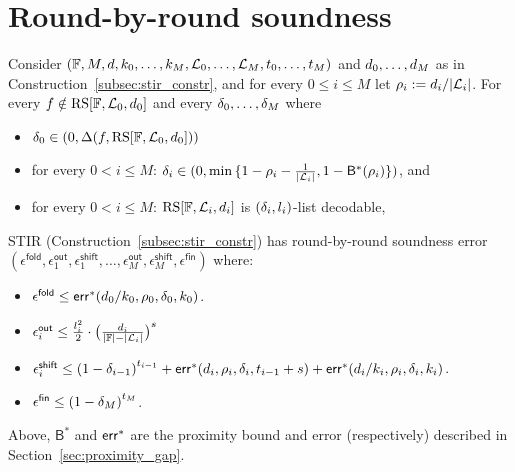 \section{Round-by-round soundness}\label{sec:rnd_by_rnd_soundness}
\begin{lemma}\label{lemma:rnd_by_rnd_soundness}
    Consider $(\mathbb{F},M,d,k_0,\ldots,k_M,\mathcal{L}_0,\ldots,\mathcal{L}_M,t_0,\ldots,t_M)$ and $d_0,\ldots,d_M$ as in Construction~\ref{subsec:stir_constr}, and for every $0\leq i\leq M$ let $\rho_i:=d_i/|\mathcal{L}_i|$. For every $f\notin\mathrm{RS}[\mathbb{F},\mathcal{L}_0,d_0]$ and every $\delta_0,\ldots,\delta_M$ where
    \begin{itemize}
        \item $\delta_0\in(0,\Delta(f,\mathrm{RS}[\mathbb{F},\mathcal{L}_0,d_0]))$
        \item for every $0<i\leq M$: $\delta_i\in(0,\min{\{1-\rho_i-\frac{1}{|\mathcal{L}_i|},1-{\mathsf{B}^*(\rho_i)}\}})$, and
        \item for every $0<i\leq M$: $\mathrm{RS}[\mathbb{F},\mathcal{L}_i,d_i]$ is $(\delta_i,l_i)$-list decodable,
    \end{itemize}
    STIR (Construction~\ref{subsec:stir_constr}) has round-by-round soundness error $(\epsilon^{\mathsf{fold}},\epsilon^{\mathsf{out}}_1,\epsilon^{\mathsf{shift}}_1,\ldots,\epsilon^{\mathsf{out}}_M,\epsilon^{\mathsf{shift}}_M,\epsilon^{\mathsf{fin}})$ where:
    \begin{itemize}
        \item $\epsilon^{\mathsf{fold}}\leq\mathsf{err}^*(d_0/k_0,\rho_0,\delta_0,k_0)$.
        \item $\epsilon^{\mathsf{out}}_i\leq\frac{l^2_i}{2}\cdot{\big(\frac{d_i}{|\mathbb{F}|-|\mathcal{L}_i|}\big)}^s$
        \item $\epsilon^{\mathsf{shift}}_i\leq {(1-\delta_{i-1})}^{t_{i-1}}+\mathsf{err}^*(d_i,\rho_i,\delta_i,t_{i-1}+s)+\mathsf{err}^*(d_i/k_i,\rho_i,\delta_i,k_i)$.
        \item $\epsilon^{\mathsf{fin}}\leq{(1-\delta_M)}^{t_M}$.
    \end{itemize}
    Above, ${\mathsf{B}}^*$ and ${\mathsf{err}}^*$ are the proximity bound and error (respectively) described in Section~\ref{sec:proximity_gap}.
\end{lemma}